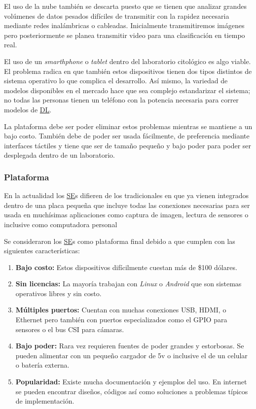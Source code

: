 El uso de la nube también se descarta puesto que se tienen que analizar grandes
volúmenes de datos pesados difíciles de transmitir con la rapidez necesaria
mediante redes inalámbricas o cableadas. Inicialmente transmitiremos imágenes
pero posteriormente se planea transmitir video para una clasificación en tiempo
real.

El uso de un \emph{smarthphone} o \emph{tablet} dentro del laboratorio
citológico es algo viable. El problema radica en que también estos dispositivos
tienen dos tipos distintos de sistema operativo lo que complica el desarrollo.
Así mismo, la variedad de modelos disponibles en el mercado hace que sea
complejo estandarizar el sistema; no todas las personas tienen un teléfono con
la potencia necesaria para correr modelos de \hyperlink{abbr}{DL}. 

La plataforma debe ser poder eliminar estos problemas mientras se mantiene a un
bajo costo. También debe de poder ser usada fácilmente, de preferencia mediante
interfaces táctiles y tiene que ser de tamaño pequeño y bajo poder para poder
ser desplegada dentro de un laboratorio.

\subsubsection{Plataforma}

En la actualidad los \hyperlink{abbr}{SE}s difieren de los tradicionales en que
ya vienen integrados dentro de una placa pequeña que incluye todas las
conexiones necesarias para ser usada en muchísimas aplicaciones como captura de
imagen, lectura de sensores o inclusive como computadora personal

Se consideraron los \hyperlink{abbr}{SE}s como plataforma final debido a que cumplen
con las siguientes características:

\begin{enumerate}
    \item{\textbf{Bajo costo: }} Estos dispositivos difícilmente cuestan más de
    \$100 dólares.
    \item{\textbf{Sin licencias: }} La mayoría trabajan con \emph{Linux} o
    \emph{Android} que son sistemas operativos libres y sin costo.
    \item{\textbf{Múltiples puertos: }} Cuentan con muchas conexiones USB, HDMI,
    o Ethernet pero también con puertos especializados como el GPIO para
    sensores o el bus CSI para cámaras.
    \item{\textbf{Bajo poder: }} Rara vez requieren fuentes de poder grandes y
    estorbosas. Se pueden alimentar con un pequeño cargador de 5v o inclusive el
    de un celular o batería externa.
    \item{\textbf{Popularidad: }} Existe mucha documentación y ejemplos del uso.
    En internet se pueden encontrar diseños, códigos así como soluciones a
    problemas típicos de implementación.
\end{enumerate}

